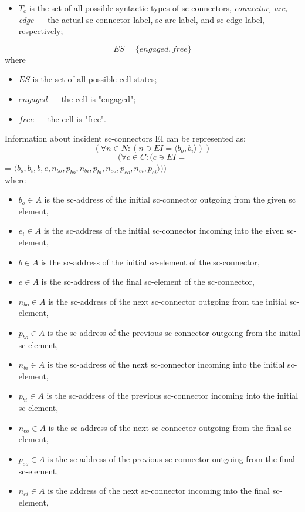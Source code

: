 \documentclass{scndocument}
\begin{document}
\begin{SCn}
\begin{multicols}{2}
\begin{itemize}
\item \textit {$T_c$} is the set of all possible syntactic types of
sc-connectors, \textit{connector, arc, edge} — the actual
sc-connector label, sc-arc label, and sc-edge label,
respectively;
\end{itemize}
\[ES = \{engaged, free\}\]
where
\begin{itemize}
    \item $ES$ is the set of all possible cell states;
\item $engaged$ — the cell is "engaged";
\item $free$ — the cell is "free".
\end{itemize}
\par Information about incident sc-connectors EI can be
represented as:
\[(\forall n \in N : ( n \ni EI = \langle b_o, b_i \rangle))\]
\[(\forall c \in C : ( c \ni EI =\]
= $\langle b_o, b_i, b, e, n_{bo}, p_{bo}, n_{bi}, p_{bi}, n_{eo}, p_{eo}, n_{ei}, p_{ei} \rangle))$
\\
where
\begin{itemize}
    \item  $b_o \in A$ is the sc-address of the initial sc-connector
outgoing from the given sc element,
\item $e_i \in A$ is the sc-address of the initial sc-connector incoming into the given sc-element,
\item $b \in A$ is the sc-address of the initial sc-element of
the sc-connector,
\item $e \in A$ is the sc-address of the final sc-element of
the sc-connector,
\item$ n_{bo} \in A$ is the sc-address of the next sc-connector
outgoing from the initial sc-element,
\item $p_{bo} \in A$ is the sc-address of the previous sc-connector outgoing from the initial sc-element,
\item $n_{bi} \in A$ is the sc-address of the next sc-connector incoming into the initial sc-element,
\item $p_{bi} \in A$ is the sc-address of the previous sc-connector incoming into the initial sc-element,
\item $n_{eo} \in A$ is the sc-address of the next sc-connector outgoing from the final sc-element,
\item $p_{eo} \in A$ is the sc-address of the previous sc-connector outgoing from the final sc-element,
\item $n_{ei} \in A$ is the address of the next sc-connector
incoming into the final sc-element,

\end{itemize}
\end{multicols}
\end{SCn}
\end{document}
